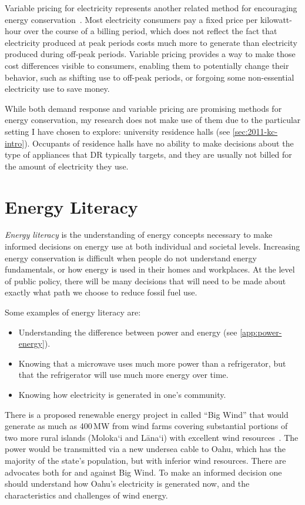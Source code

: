 Variable pricing for electricity represents another related method for encouraging energy conservation~\cite{Hammerstrom2007}. Most electricity consumers pay a fixed price per kilowatt-hour over the course of a billing period, which does not reflect the fact that electricity produced at peak periods costs much more to generate than electricity produced during off-peak periods. Variable pricing provides a way to make those cost differences visible to consumers, enabling them to potentially change their behavior, such as shifting use to off-peak periods, or forgoing some non-essential electricity use to save money.

While both demand response and variable pricing are promising methods for energy conservation, my research does not make use of them due to the particular setting I have chosen to explore: university residence halls (see \autoref{sec:2011-kc-intro}). Occupants of residence halls have no ability to make decisions about the type of appliances that DR typically targets, and they are usually not billed for the amount of electricity they use.


\section{Energy Literacy}

\emph{Energy literacy} is the understanding of energy concepts necessary to make informed decisions on energy use at both individual and societal levels. Increasing energy conservation is difficult when people do not understand energy fundamentals, or how energy is used in their homes and workplaces. At the level of public policy, there will be many decisions that will need to be made about exactly what path we choose to reduce fossil fuel use.

Some examples of energy literacy are:

\begin{itemize}
	\item Understanding the difference between power and energy (see \autoref{app:power-energy}).
	\item Knowing that a microwave uses much more power than a refrigerator, but that the refrigerator will use much more energy over time.
	\item Knowing how electricity is generated in one's community.
\end{itemize}

There is a proposed renewable energy project in \Hawaii called ``Big Wind'' that would generate as much as 400\,MW from wind farms covering substantial portions of two more rural islands (Moloka`i and L\=ana`i) with excellent wind resources~\cite{big-wind}. The power would be transmitted via a new undersea cable to Oahu, which has the majority of the state's population, but with inferior wind resources. There are advocates both for and against Big Wind. To make an informed decision one should understand how Oahu's electricity is generated now, and the characteristics and challenges of wind energy.


